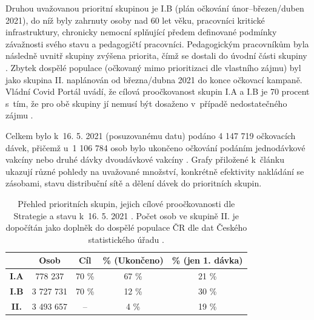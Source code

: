 %
Druhou uvažovanou prioritní skupinou je I.B (plán očkování únor--březen/duben 2021), do níž byly zahrnuty osoby nad 60 let věku, pracovníci kritické infrastruktury, chronicky nemocní splňující předem definované podmínky závažnosti svého stavu a pedagogičtí pracovníci. %
Pedagogickým pracovníkům byla následně uvnitř skupiny zvýšena priorita, čímž se dostali do úvodní části skupiny \cite{prioritizace_ockovani}. Zbytek dospělé populace (očkovaný mimo prioritizaci dle vlastního zájmu) byl jako skupina II. naplánován od března/dubna 2021 do konce očkovací kampaně. Vládní Covid Portál uvádí, že cílová proočkovanost skupin I.A a I.B je 70 procent s~tím, že pro obě skupiny jí nemusí být dosaženo v~případě nedostatečného zájmu \cite{kdoprvni}.

Celkem bylo k~16. 5. 2021 (posuzovanému datu) podáno 4 147 719 očkovacích dávek, přičemž u~1 106 784 osob bylo ukončeno očkování podáním jednodávkové vakcíny nebo druhé dávky dvoudávkové vakcíny \cite{mzcr_data}. Grafy přiložené k~článku ukazují různé pohledy na uvažované množství, konkrétně efektivity na\-klá\-dá\-ní se zásobami, stavu distribuční sítě a dělení dávek do prioritních skupin.



\begin{table}
\begin{minipage}{\textwidth} 
\begin{centering}
\begin{tabular}{|c|c|c|c|c|}
\hline
& \textbf{Osob} & \textbf{Cíl} & \textbf{\% (Ukončeno)} & \textbf{\% (jen 1. dávka)}  \\
\hline
\textbf{I.A} & 778 237 & 70 \% & 67 \% & 21 \% \\
\hline
\textbf{I.B} & 3 727 731 & 70 \% & 12 \% & 30 \%\\
\hline
\textbf{II.} & 3 493 657 & -- & 4 \% & 19 \% \\
\hline
\end{tabular}
	\caption{Přehled prioritních skupin, jejich cílové proočkovanosti dle Strategie a stavu k~16. 5. 2021 \cite{strategie_covid}. Počet osob ve skupině II. je dopočítán jako doplněk do dospělé populace ČR dle dat Českého statistického úřadu \cite{obyvatele_pocet}.}
    \label{tab_skupiny}
    
    \end{centering}
\end{minipage}
\end{table}


